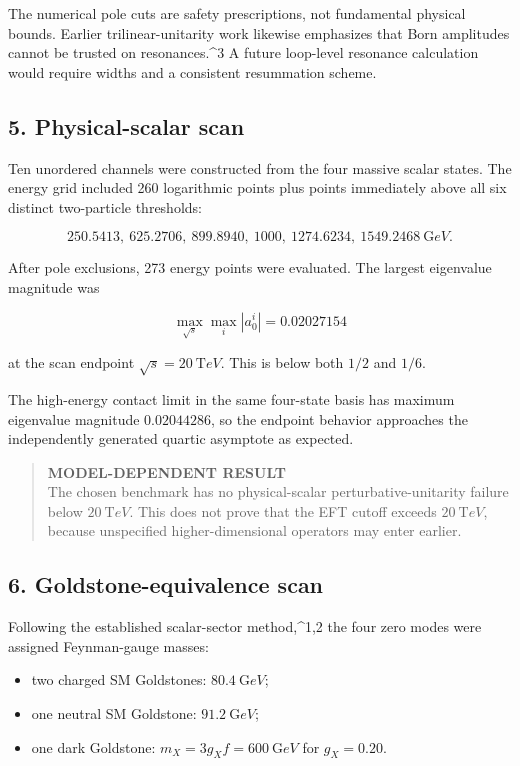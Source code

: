 \documentclass[
]{article}
\providecommand{\tightlist}{%
  \setlength{\itemsep}{0pt}\setlength{\parskip}{0pt}}
\begin{document}
The numerical pole cuts are safety prescriptions, not fundamental
physical bounds. Earlier trilinear-unitarity work likewise emphasizes
that Born amplitudes cannot be trusted on resonances.\^{}3 A future
loop-level resonance calculation would require widths and a consistent
resummation scheme.

\hypertarget{physical-scalar-scan}{%
\subsection{5. Physical-scalar scan}\label{physical-scalar-scan}}

Ten unordered channels were constructed from the four massive scalar
states. The energy grid included 260 logarithmic points plus points
immediately above all six distinct two-particle thresholds:

\[
250.5413,\ 625.2706,\ 899.8940,\ 1000,\ 1274.6234,\ 1549.2468\ {\mathrm GeV}.
\]

After pole exclusions, 273 energy points were evaluated. The largest
eigenvalue magnitude was

\[
\max_{\sqrt{s}}\max_i|a_0^i|
=0.02027154
\]

at the scan endpoint \(\sqrt{s}=20\ {\mathrm TeV}\). This is below both
\(1/2\) and \(1/6\).

The high-energy contact limit in the same four-state basis has maximum
eigenvalue magnitude \(0.02044286\), so the endpoint behavior approaches
the independently generated quartic asymptote as expected.

\begin{quote}
\textbf{MODEL-DEPENDENT RESULT}\\
The chosen benchmark has no physical-scalar perturbative-unitarity
failure below \(20\ {\mathrm TeV}\). This does not prove that the EFT
cutoff exceeds \(20\ {\mathrm TeV}\), because unspecified
higher-dimensional operators may enter earlier.
\end{quote}

\hypertarget{goldstone-equivalence-scan}{%
\subsection{6. Goldstone-equivalence
scan}\label{goldstone-equivalence-scan}}

Following the established scalar-sector method,\^{}1,2 the four zero
modes were assigned Feynman-gauge masses:

\begin{itemize}
\tightlist
\item
  two charged SM Goldstones: \(80.4\ {\mathrm GeV}\);
\item
  one neutral SM Goldstone: \(91.2\ {\mathrm GeV}\);
\item
  one dark Goldstone: \(m_X=3g_Xf=600\ {\mathrm GeV}\) for \(g_X=0.20\).
\end{itemize}
\end{document}
